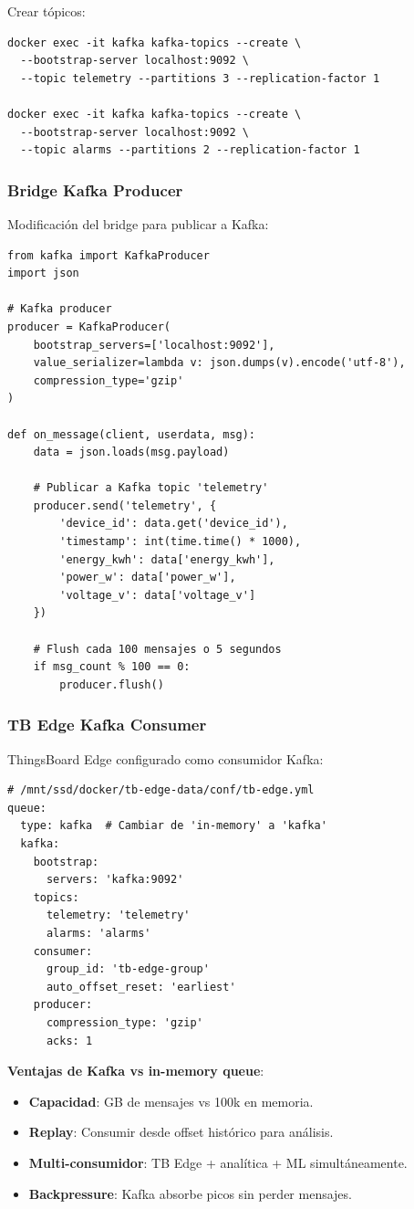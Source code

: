 Crear tópicos:
\begin{verbatim}
docker exec -it kafka kafka-topics --create \
  --bootstrap-server localhost:9092 \
  --topic telemetry --partitions 3 --replication-factor 1

docker exec -it kafka kafka-topics --create \
  --bootstrap-server localhost:9092 \
  --topic alarms --partitions 2 --replication-factor 1
\end{verbatim}

\subsubsection{Bridge Kafka Producer}

Modificación del bridge para publicar a Kafka:
\begin{verbatim}
from kafka import KafkaProducer
import json

# Kafka producer
producer = KafkaProducer(
    bootstrap_servers=['localhost:9092'],
    value_serializer=lambda v: json.dumps(v).encode('utf-8'),
    compression_type='gzip'
)

def on_message(client, userdata, msg):
    data = json.loads(msg.payload)
    
    # Publicar a Kafka topic 'telemetry'
    producer.send('telemetry', {
        'device_id': data.get('device_id'),
        'timestamp': int(time.time() * 1000),
        'energy_kwh': data['energy_kwh'],
        'power_w': data['power_w'],
        'voltage_v': data['voltage_v']
    })
    
    # Flush cada 100 mensajes o 5 segundos
    if msg_count % 100 == 0:
        producer.flush()
\end{verbatim}

\subsubsection{TB Edge Kafka Consumer}

ThingsBoard Edge configurado como consumidor Kafka:
\begin{verbatim}
# /mnt/ssd/docker/tb-edge-data/conf/tb-edge.yml
queue:
  type: kafka  # Cambiar de 'in-memory' a 'kafka'
  kafka:
    bootstrap:
      servers: 'kafka:9092'
    topics:
      telemetry: 'telemetry'
      alarms: 'alarms'
    consumer:
      group_id: 'tb-edge-group'
      auto_offset_reset: 'earliest'
    producer:
      compression_type: 'gzip'
      acks: 1
\end{verbatim}

\textbf{Ventajas de Kafka vs in-memory queue}:
\begin{itemize}
    \item \textbf{Capacidad}: GB de mensajes vs 100k en memoria.
    \item \textbf{Replay}: Consumir desde offset histórico para análisis.
    \item \textbf{Multi-consumidor}: TB Edge + analítica + ML simultáneamente.
    \item \textbf{Backpressure}: Kafka absorbe picos sin perder mensajes.
\end{itemize}

